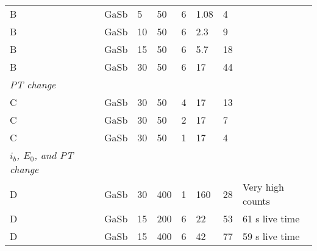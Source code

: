 \begin{table}[phtb]
\begin{center}
\begin{tabular}{lllllllp{3.5cm}}
            B                          & GaSb            & 5              & 50             & 6           & 1.08         & 4           &                     \\
            B                          & GaSb            & 10             & 50             & 6           & 2.3          & 9           &                     \\
            B                          & GaSb            & 15             & 50             & 6           & 5.7          & 18          &                     \\
            B                          & GaSb            & 30             & 50             & 6           & 17           & 44          &                     \\
            \hline
            \emph{PT change}           &                 &                &                &             &              &             &                     \\
            C                          & GaSb            & 30             & 50             & 4           & 17           & 13          &                     \\
            C                          & GaSb            & 30             & 50             & 2           & 17           & 7           &                     \\
            C                          & GaSb            & 30             & 50             & 1           & 17           & 4           &                     \\
            \hline
            \emph{$i_b$, $E_0$, and PT change} &                 &                &                &             &              &             &                     \\
            D                          & GaSb            & 30             & 400            & 1           & 160          & 28          & Very high counts    \\
            D                          & GaSb            & 15             & 200            & 6           & 22           & 53          & 61 s live time      \\
            D                          & GaSb            & 15             & 400            & 6           & 42           & 77          & 59 s live time      \\

\end{tabular}
\end{center}
\end{table}
